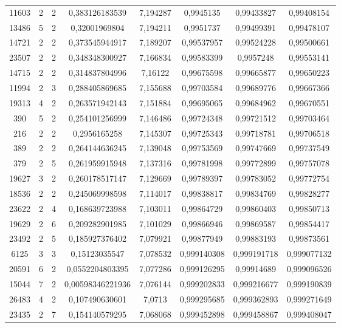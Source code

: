 \begin{longtable}{|c|c|c|c|c|c|c|c|}
11603 & 2 & 2 & 0,383126183539 & 7,194287 & 0,9945135 & 0,99433827 & 0,99408154 \\
13486 & 5 & 2 & 0,32001969804 & 7,194211 & 0,9951737 & 0,99499391 & 0,99478107 \\
14721 & 2 & 2 & 0,373545944917 & 7,189207 & 0,99537957 & 0,99524228 & 0,99500661 \\
23507 & 2 & 2 & 0,348348300927 & 7,166834 & 0,99583399 & 0,9957248 & 0,99553141 \\
14715 & 2 & 2 & 0,314837804996 & 7,16122 & 0,99675598 & 0,99665877 & 0,99650223 \\
11994 & 2 & 3 & 0,288405869685 & 7,155688 & 0,99703584 & 0,99689776 & 0,99667366 \\
19313 & 4 & 2 & 0,263571942143 & 7,151884 & 0,99695065 & 0,99684962 & 0,99670551 \\
390 & 5 & 2 & 0,254101256999 & 7,146486 & 0,99724348 & 0,99721512 & 0,99703464 \\
216 & 2 & 2 & 0,2956165258 & 7,145307 & 0,99725343 & 0,99718781 & 0,99706518 \\
389 & 2 & 2 & 0,264144636245 & 7,139048 & 0,99753569 & 0,99747669 & 0,99737549 \\
379 & 2 & 5 & 0,261959915948 & 7,137316 & 0,99781998 & 0,99772899 & 0,99757078 \\
19627 & 3 & 2 & 0,260178517147 & 7,129669 & 0,99789397 & 0,99783052 & 0,99772754 \\
18536 & 2 & 2 & 0,245069998598 & 7,114017 & 0,99838817 & 0,99834769 & 0,99828277 \\
23622 & 2 & 4 & 0,168639723988 & 7,103011 & 0,99864729 & 0,99860403 & 0,99850713 \\
19629 & 2 & 6 & 0,209282901985 & 7,101029 & 0,99866946 & 0,99869587 & 0,99854417 \\
23492 & 2 & 5 & 0,185927376402 & 7,079921 & 0,99877949 & 0,99883193 & 0,99873561 \\
6125 & 3 & 3 & 0,15123035547 & 7,078532 & 0,999140308 & 0,999191718 & 0,999077132 \\
20591 & 6 & 2 & 0,0552204803395 & 7,077286 & 0,999126295 & 0,99914689 & 0,999096526 \\
15044 & 7 & 2 & 0,00598346221936 & 7,076144 & 0,999202833 & 0,999216677 & 0,999190839 \\
26483 & 4 & 2 & 0,107490630601 & 7,0713 & 0,999295685 & 0,999362893 & 0,999271649 \\
23435 & 2 & 7 & 0,154140579295 & 7,068068 & 0,999452898 & 0,999458867 & 0,999408047 \\

\end{longtable}
